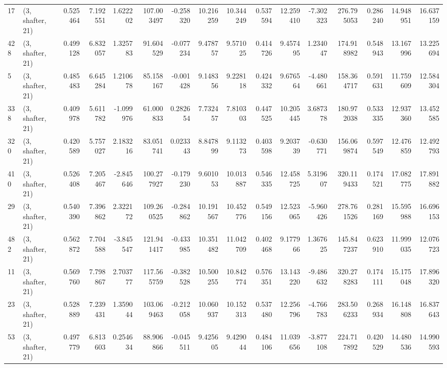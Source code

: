 \begin{tabular}{llrrrrrrrrrrrrrr}
17  &  (3, shafter, 21) &   0.525464 &   7.192551 &   1.622202 &   107.003497 &  -0.258320 &  10.216259 &  10.344249 &  0.537594 &  12.259410 &  -7.302323 &    276.795053 &    0.286240 &   14.948951 &   16.637159 \\
428 &  (3, shafter, 21) &   0.499128 &   6.832057 &   1.325783 &    91.604529 &  -0.077234 &   9.478757 &   9.571025 &  0.414726 &   9.457495 &   1.234047 &    174.918982 &    0.548943 &   13.167996 &   13.225694 \\
5   &  (3, shafter, 21) &   0.485483 &   6.645284 &   1.210678 &    85.158167 &  -0.001428 &   9.148356 &   9.228118 &  0.424332 &   9.676564 &  -4.480661 &    158.364717 &    0.591631 &   11.759609 &   12.584304 \\
338 &  (3, shafter, 21) &   0.409978 &   5.611782 &  -1.099976 &    61.000833 &   0.282654 &   7.732457 &   7.810303 &  0.447525 &  10.205445 &   3.687378 &    180.972038 &    0.533335 &   12.937360 &   13.452585 \\
320 &  (3, shafter, 21) &   0.420589 &   5.757027 &   2.183216 &    83.051741 &   0.023343 &   8.847899 &   9.113273 &  0.403598 &   9.203739 &  -0.630771 &    156.069874 &    0.597549 &   12.476859 &   12.492793 \\
410 &  (3, shafter, 21) &   0.526408 &   7.205467 &  -2.845646 &   100.277927 &  -0.179230 &   9.601053 &  10.013887 &  0.546335 &  12.458725 &   5.319607 &    320.119433 &    0.174521 &   17.082775 &   17.891882 \\
29  &  (3, shafter, 21) &   0.540390 &   7.396862 &   2.322172 &   109.260525 &  -0.284862 &  10.191567 &  10.452776 &  0.549156 &  12.523065 &  -5.960426 &    278.761526 &    0.281169 &   15.595988 &   16.696153 \\
482 &  (3, shafter, 21) &   0.562872 &   7.704588 &  -3.845547 &   121.941417 &  -0.433985 &  10.351482 &  11.042709 &  0.402468 &   9.177966 &   1.367625 &    145.847237 &    0.623910 &   11.999035 &   12.076723 \\
11  &  (3, shafter, 21) &   0.569760 &   7.798867 &   2.703777 &   117.565759 &  -0.382528 &  10.500255 &  10.842774 &  0.576351 &  13.143220 &  -9.486632 &    320.278283 &    0.174111 &   15.175048 &   17.896320 \\
23  &  (3, shafter, 21) &   0.528889 &   7.239431 &   1.359044 &   103.069463 &  -0.212058 &  10.060937 &  10.152313 &  0.537480 &  12.256796 &  -4.766783 &    283.506233 &    0.268934 &   16.148808 &   16.837643 \\
53  &  (3, shafter, 21) &   0.497779 &   6.813603 &   0.254634 &    88.906866 &  -0.045511 &   9.425605 &   9.429044 &  0.484106 &  11.039656 &  -3.877108 &    224.717892 &    0.420529 &   14.480536 &   14.990593 \\

\end{tabular}

